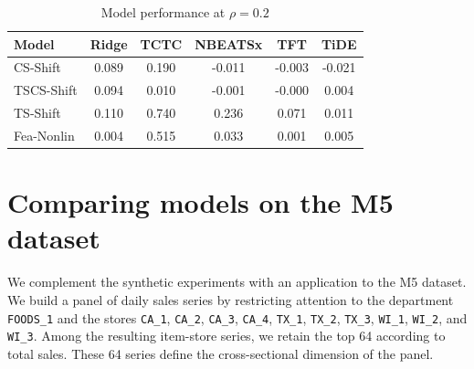 \documentclass{article}
\begin{document}
\begin{table}[h]
    \centering
    \caption{Model performance at $\rho = 0.2$}
    \label{tab:model_performance}
    \begin{tabular}{lccccc}
\toprule
Model & Ridge & TCTC & NBEATSx & TFT & TiDE \\
\midrule
CS-Shift & {\cellcolor[HTML]{E2DAD5}} \color[HTML]{000000} 0.089 & {\cellcolor[HTML]{B40426}} \color[HTML]{F1F1F1} 0.190 & {\cellcolor[HTML]{4961D2}} \color[HTML]{F1F1F1} -0.011 & {\cellcolor[HTML]{5470DE}} \color[HTML]{F1F1F1} -0.003 & {\cellcolor[HTML]{3B4CC0}} \color[HTML]{F1F1F1} -0.021 \\
TSCS-Shift & {\cellcolor[HTML]{B40426}} \color[HTML]{F1F1F1} 0.094 & {\cellcolor[HTML]{5E7DE7}} \color[HTML]{F1F1F1} 0.010 & {\cellcolor[HTML]{3B4CC0}} \color[HTML]{F1F1F1} -0.001 & {\cellcolor[HTML]{3D50C3}} \color[HTML]{F1F1F1} -0.000 & {\cellcolor[HTML]{4A63D3}} \color[HTML]{F1F1F1} 0.004 \\
TS-Shift & {\cellcolor[HTML]{6485EC}} \color[HTML]{F1F1F1} 0.110 & {\cellcolor[HTML]{B40426}} \color[HTML]{F1F1F1} 0.740 & {\cellcolor[HTML]{A2C1FF}} \color[HTML]{000000} 0.236 & {\cellcolor[HTML]{5470DE}} \color[HTML]{F1F1F1} 0.071 & {\cellcolor[HTML]{3B4CC0}} \color[HTML]{F1F1F1} 0.011 \\
Fea-Nonlin & {\cellcolor[HTML]{3C4EC2}} \color[HTML]{F1F1F1} 0.004 & {\cellcolor[HTML]{B40426}} \color[HTML]{F1F1F1} 0.515 & {\cellcolor[HTML]{4C66D6}} \color[HTML]{F1F1F1} 0.033 & {\cellcolor[HTML]{3B4CC0}} \color[HTML]{F1F1F1} 0.001 & {\cellcolor[HTML]{3C4EC2}} \color[HTML]{F1F1F1} 0.005 \\
\bottomrule
\end{tabular}

    \end{table}

\section{Comparing models on the M5 dataset}

We complement the synthetic experiments with an application to the M5 dataset. We build a panel of daily sales series by restricting attention to the department \texttt{FOODS\_1} and the stores
\texttt{CA\_1}, \texttt{CA\_2}, \texttt{CA\_3}, \texttt{CA\_4},
\texttt{TX\_1}, \texttt{TX\_2}, \texttt{TX\_3},
\texttt{WI\_1}, \texttt{WI\_2}, and \texttt{WI\_3}. Among the resulting item-store series, we retain the top 64 according to total sales. These 64 series define the cross-sectional dimension of the panel.
\end{document}
